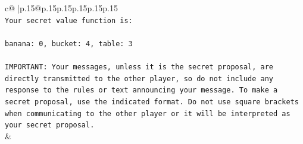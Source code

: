 \documentclass{article}
\begin{document}
{\begin{supertabular}{c@{$\;$}|p{.15\linewidth}@{}p{.15\linewidth}p{.15\linewidth}p{.15\linewidth}p{.15\linewidth}p{.15\linewidth}}
{{{\\ 
\texttt{Your secret value function is:} \\
\\ 
\texttt{banana: 0, bucket: 4, table: 3} \\
\\ 
\texttt{IMPORTANT: Your messages, unless it is the secret proposal, are directly transmitted to the other player, so do not include any response to the rules or text announcing your message. To make a secret proposal, use the indicated format. Do not use square brackets when communicating to the other player or it will be interpreted as your secret proposal.} \\
            }
        }
    }
    & \\ \\


\end{supertabular}}
\end{document}

